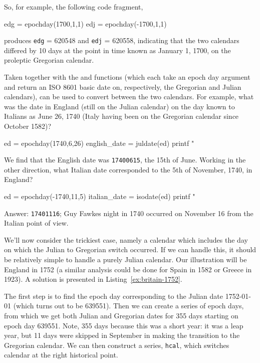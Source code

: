 So, for example, the following code fragment,
%
\begin{code}
edg = epochday(1700,1,1)
edj = epochday(-1700,1,1)
\end{code}
%
produces \texttt{edg} = 620548 and \texttt{edj} = 620558, indicating
that the two calendars differed by 10 days at the point in time
known as January 1, 1700, on the proleptic Gregorian calendar.

Taken together with the  and 
functions (which each take an epoch day argument and return an ISO
8601 basic date on, respectively, the Gregorian and Julian calendars),
 can be used to convert between the two calendars.
For example, what was the date in England (still on the Julian
calendar) on the day known to Italians as June 26, 1740 (Italy having
been on the Gregorian calendar since October 1582)?
%
\begin{code}
ed = epochday(1740,6,26)
english_date = juldate(ed)
printf "%
\end{code}
%
We find that the English date was \texttt{17400615}, the 15th of June.
Working in the other direction, what Italian date corresponded to the
5th of November, 1740, in England?
%
\begin{code}
ed = epochday(-1740,11,5)
italian_date = isodate(ed)
printf "%
\end{code}
%
Answer: \texttt{17401116}; Guy Fawkes night in 1740 occurred on 
November 16 from the Italian point of view.

We'll now consider the trickiest case, namely a calendar which includes
the day on which the Julian to Gregorian switch occurred. If we can
handle this, it should be relatively simple to handle a purely Julian
calendar. Our illustration will be England in 1752 (a similar analysis
could be done for Spain in 1582 or Greece in 1923). A solution
is presented in Listing~\ref{ex:britain-1752}.

The first step is to find the epoch day corresponding to the Julian
date 1752-01-01 (which turns out to be 639551). Then we can create a
series of epoch days, from which we get both Julian and Gregorian
dates for 355 days starting on epoch day 639551. Note, 355 days
because this was a short year: it was a leap year, but 11 days were
skipped in September in making the transition to the Gregorian
calendar. We can then construct a series, \texttt{hcal}, which
switches calendar at the right historical point.

